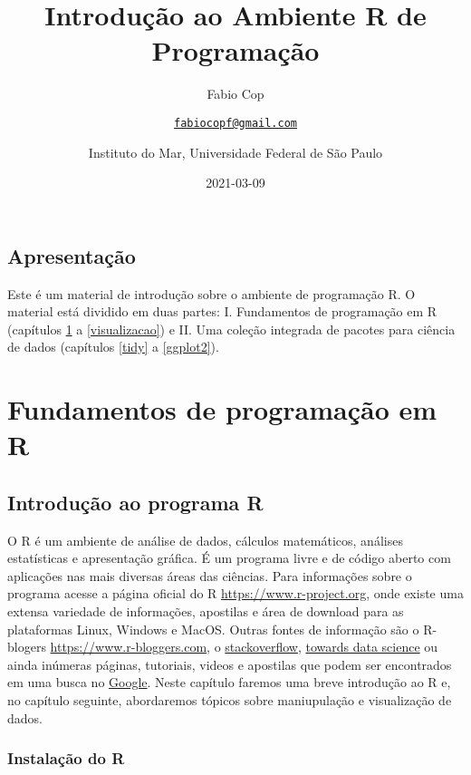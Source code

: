 \documentclass[
]{book}
\title{Introdução ao Ambiente R de Programação}
\author{Fabio Cop \and \href{mailto:fabiocopf@gmail.com}{\nolinkurl{fabiocopf@gmail.com}} \and Instituto do Mar, Universidade Federal de São Paulo}
\date{2021-03-09}
\begin{document}
\maketitle

{
\setcounter{tocdepth}{1}
\tableofcontents
}
\hypertarget{apresentauxe7uxe3o}{%
\chapter*{Apresentação}\label{apresentauxe7uxe3o}}

Este é um material de introdução sobre o ambiente de programação R. O material está dividido em duas partes: I. Fundamentos de programação em R (capítulos \ref{intro} a \ref{visualizacao}) e II. Uma coleção integrada de pacotes para ciência de dados (capítulos \ref{tidy} a \ref{ggplot2}).

\hypertarget{part-fundamentos-de-programauxe7uxe3o-em-r}{%
\part{Fundamentos de programação em R}\label{part-fundamentos-de-programauxe7uxe3o-em-r}}

\hypertarget{intro}{%
\chapter{Introdução ao programa R}\label{intro}}

O R é um ambiente de análise de dados, cálculos matemáticos, análises estatísticas e apresentação gráfica. É um programa livre e de código aberto com aplicações nas mais diversas áreas das ciências. Para informações sobre o programa acesse a página oficial do R \href{https://www.r-project.org/}{https://www.r-project.org}, onde existe uma extensa variedade de informações, apostilas e área de download para as plataformas Linux, Windows e MacOS. Outras fontes de informação são o R-blogers \href{https://www.r-bloggers.com/}{https://www.r-bloggers.com}, o \href{https://pt.stackoverflow.com/}{stackoverflow}, \href{https://towardsdatascience.com/}{towards data science} ou ainda inúmeras páginas, tutoriais, videos e apostilas que podem ser encontrados em uma busca no \href{https://www.google.com.br/}{Google}. Neste capítulo faremos uma breve introdução ao R e, no capítulo seguinte, abordaremos tópicos sobre maniupulação e visualização de dados.

\hypertarget{instalauxe7uxe3o-do-r}{%
\section{Instalação do R}\label{instalauxe7uxe3o-do-r}}
\end{document}
